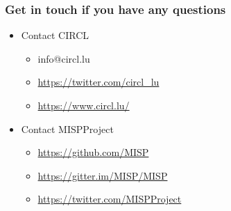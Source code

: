 \begin{frame}
  \frametitle{Get in touch if you have any questions}
  \begin{itemize}
    \item Contact CIRCL
    \begin{itemize}
      \item info@circl.lu
      \item \url{https://twitter.com/circl_lu}
      \item \url{https://www.circl.lu/}
    \end{itemize}
    \item Contact MISPProject 
    \begin{itemize}
      \item \url{https://github.com/MISP}
      \item \url{https://gitter.im/MISP/MISP}
      \item \url{https://twitter.com/MISPProject}
    \end{itemize}
  \end{itemize}
\end{frame}
